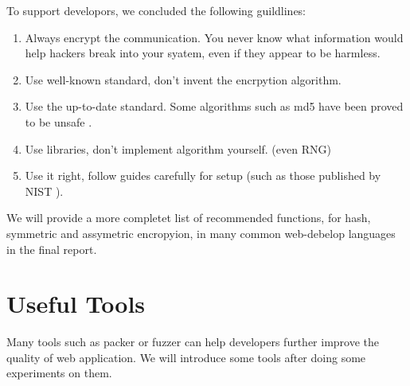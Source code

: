 \documentclass[10pt, a4paper]{article}
\begin{document}
To support developors, we concluded the following guildlines:
\begin{enumerate}[label=\textbf{\arabic*.}]
    \item
Always encrypt the communication. You never know what information would help hackers
break into your syatem, even if they appear to be harmless.
    \item
Use well-known standard, don't invent the encrpytion algorithm.
    \item
Use the up-to-date standard.
Some algorithms such as md5 have been proved to be unsafe \cite{md5_break}.
    \item
Use libraries, don't implement algorithm yourself.
(even  RNG)
    \item
Use it right,
follow guides carefully for setup (such as those published by NIST \cite{NIST}).
\end{enumerate}

We will provide a more completet list of recommended functions,
for hash, symmetric and assymetric encropyion,
in many common web-debelop languages
in the final report.

%
%
%
%


%   
\section{Useful Tools}
Many tools such as packer or fuzzer can help developers
further improve the quality of web application.
We will introduce some tools after doing some experiments on them.
\end{document}
